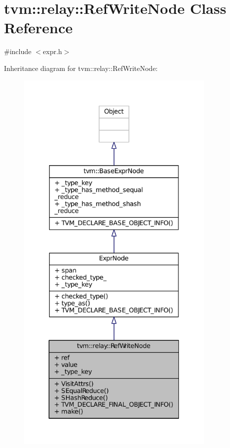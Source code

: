 \hypertarget{classtvm_1_1relay_1_1RefWriteNode}{}\section{tvm\+:\+:relay\+:\+:Ref\+Write\+Node Class Reference}
\label{classtvm_1_1relay_1_1RefWriteNode}


{\ttfamily \#include $<$expr.\+h$>$}



Inheritance diagram for tvm\+:\+:relay\+:\+:Ref\+Write\+Node\+:
\nopagebreak
\begin{figure}[H]
\begin{center}
\leavevmode
\includegraphics[height=550pt]{classtvm_1_1relay_1_1RefWriteNode__inherit__graph}
\end{center}
\end{figure}


